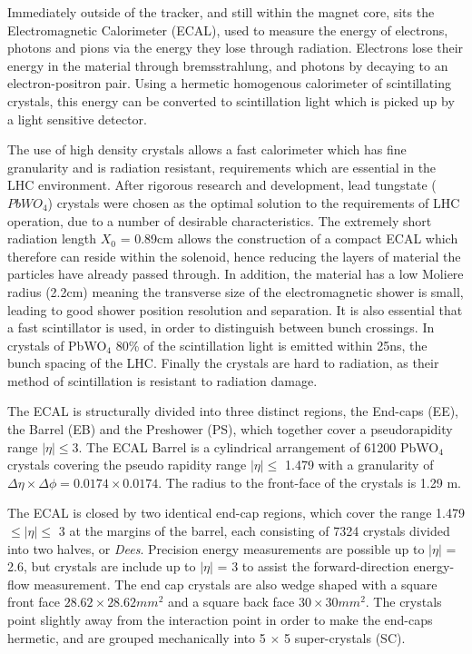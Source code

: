 Immediately outside of the tracker, and still within the magnet core, sits the Electromagnetic Calorimeter (ECAL), used to measure the energy of electrons, photons and pions via the energy they lose through radiation. Electrons lose their energy in the material through bremsstrahlung, and photons by decaying to an electron-positron pair. Using a hermetic homogenous calorimeter of scintillating crystals, this energy can be converted to scintillation light which is picked up by a light sensitive detector. 

The use of high density crystals allows a fast calorimeter which has fine granularity and is radiation resistant, requirements which are essential in the LHC environment. After rigorous research and development, lead tungstate ($PbWO_{4}$) crystals were chosen as the optimal solution to the requirements of LHC operation, due to a number of desirable characteristics. The extremely short radiation length $X_{0}$ = 0.89cm allows the construction of a compact ECAL which therefore can reside within the solenoid, hence reducing the layers of material the particles have already passed through. In addition, the material has a low Moliere radius (2.2cm) meaning the transverse size of the electromagnetic shower is small, leading to good shower position resolution and separation. It is also essential that a fast scintillator is used, in order to distinguish between bunch crossings. In crystals of PbWO$_{4}$ 80\% of the scintillation light is emitted within 25ns, the bunch spacing of the LHC. Finally the crystals are hard to radiation, as their method of scintillation is resistant to radiation damage. 

The ECAL is structurally divided into three distinct regions, the End-caps (EE), the Barrel (EB) and the Preshower (PS), which together cover a pseudorapidity range $|\eta| \leq$3. The ECAL Barrel is a cylindrical arrangement of 61200 PbWO$_{4}$ crystals covering the pseudo rapidity range $|\eta| \leq$ 1.479 with a granularity of $\Delta \eta \times \Delta \phi = 0.0174 \times 0.0174$. The radius to the front-face of the crystals is 1.29 m. 


The ECAL is closed by two identical end-cap regions, which cover the range 1.479 $\leq |\eta| \leq$ 3 at the margins of the barrel, each consisting of 7324 crystals divided into two halves, or \textit{Dees}. Precision energy measurements are possible up to $|\eta|$ = 2.6, but crystals are include up to $|\eta|$ = 3 to assist the forward-direction energy-flow measurement. The end cap crystals are also wedge shaped with a square front face $28.62 \times 28.62 mm^{2}$ and a square back face $30 \times 30 mm^{2}$. The crystals point slightly away from the interaction point in order to make the end-caps hermetic, and are grouped mechanically into 5 $\times$ 5 super-crystals (SC). 


